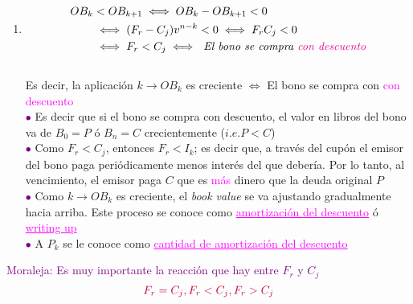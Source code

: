 \begin{enumerate}
    \item \begin{align*}
        OB_k &< OB_{k+1} \iff OB_k-OB_{k+1} <0\\
        &\iff (F_r-C_j)v^{n-k} <0 \iff F_rC_j<0\\
        &\iff F_r<C_j \iff \textit{ El bono se compra \textcolor{magenta}{con descuento}}
    \end{align*}\\
    Es decir, la aplicación $k\longrightarrow OB_k$ es creciente $\iff$ El bono se compra con \textcolor{magenta}{con descuento}\\
    \textcolor{purple}{$\bullet$} Es decir que si el bono se compra con descuento, el valor en libros del bono va de $B_0=P$ ó $B_n=C$ crecientemente ($i.e. P<C$)\\
    \textcolor{purple}{$\bullet$} Como $F_r<C_j$, entonces $F_r<I_k$; es decir que, a través del cupón el emisor del bono paga periódicamente menos interés del que debería. Por lo tanto, al vencimiento, el emisor paga $C$ que es \textcolor{magenta}{más} dinero que la deuda original $P$\\
    \textcolor{purple}{$\bullet$} Como $k\longrightarrow OB_k$ es creciente, el \textit{book value} se va ajustando gradualmente hacia arriba. Este proceso se conoce como \textcolor{magenta}{\underline{amortización del descuento}} ó \textcolor{magenta}{\underline{writing up}}\\
    \textcolor{purple}{$\bullet$} A $P_k$ se le conoce como \textcolor{magenta}{\underline{cantidad de amortización del descuento}}
\end{enumerate}
\textcolor{purple}{Moraleja: Es muy importante la reacción que hay entre $F_r$ y $C_j$}
$$\textcolor{purple}{F_r=C_j, F_r<C_j,F_r>C_j}$$



